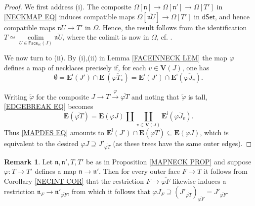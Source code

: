 \documentclass[a4paper,10pt]{article}%
\numberwithin{equation}{section}
\numberwithin{figure}{section}
\theoremstyle{definition} %
\newtheorem{remark}[equation]{Remark}%
\DeclareMathOperator{\colim}{colim}%
\newcommand{\1}{\ensuremath{\mathbbm 1}}%
\begin{document}
\begin{proof}
	We first address (i).
	The composite
	$\Omega[\mathfrak{n}] \to 
	\Omega[\mathfrak{n}'] \to 
	\Omega[T']$
	in \eqref{NECKMAP EQ}
	induces compatible maps
	$\Omega[\overline{\mathfrak{n} U}] \to \Omega[T']$
	in $\mathsf{dSet}$,
	and hence 
	compatible maps
	$\overline{\mathfrak{n} U} \to T'$ 
	in $\Omega$.
	Hence, the result follows from the identification
	$T
	\simeq  
	\underset{U \in \mathsf{Face}_{sc}(J)}{\colim}
	\overline{\mathfrak{n} U}$, where the colimit is now in $\Omega$,
	cf. \cite[Cor. 3.70]{BP_geo}.
	
	We now turn to (ii).
	By (i),(ii) in Lemma \ref{FACEINNECK LEM}
	the map $\varphi$ defines a map of necklaces 
	precisely if, 
	for each $v \in \boldsymbol{V}(J)$, one has
	\begin{equation}\label{MAPDES EQ}
	\emptyset
	=
	\boldsymbol{E}^{\mathsf{i}}(J')
	\cap
	\boldsymbol{E}^{\mathsf{i}}(\overline{ \varphi T_v})
	=
	\boldsymbol{E}^{\mathsf{i}}(J')
	\cap
	\boldsymbol{E}^{\mathsf{i}}(\overline{ \varphi J_v}).
	\end{equation}
	
	Writing $\tilde{\varphi}$ for the composite
	$
	J \to T \xrightarrow{\varphi} \overline{\varphi T}
	$
	and noting that $\tilde{\varphi}$ is tall,
	\eqref{EDGEBREAK EQ} becomes 
	\begin{equation}\label{DECOMPPR EQ}
	\boldsymbol{E}(\overline{\varphi T})
	=
	\boldsymbol{E}(\varphi J)
	\amalg
	\coprod_{v \in \boldsymbol{V}(J)}
	\boldsymbol{E}^{\mathsf{i}}(\overline{\varphi J_v}).
	\end{equation}
	Thus \eqref{MAPDES EQ}
	amounts to
	$\boldsymbol{E}^{\mathsf{i}}(J') \cap 
	\boldsymbol{E}(\overline{\varphi T})
	\subseteq
	\boldsymbol{E}(\varphi J)$,
	which is equivalent to the desired
	$\varphi J \supseteq J'_{\overline{\varphi T}}$
	(as these trees have the same outer edges).
\end{proof}



\begin{remark}\label{NECKMAPCHAR REM}
	Let $\mathfrak{n},\mathfrak{n}',T,T'$ be as in
	Proposition \ref{MAPNECK PROP}
	and suppose 
	$\varphi \colon T \to T'$
	defines a map
	$\mathfrak{n} \to \mathfrak{n}'$.
	Then for every outer face $F \to T$
	it follows from 
	Corollary \ref{NECINT COR}
	that the restriction 
	$F \to \overline{\varphi F}$
	likewise induces a restriction
	$\mathfrak{n}_F \to \mathfrak{n}'_{\overline{\varphi F}}$,
	from which it follows that
	$\varphi J_F \supseteq 
	\left(J'_{\overline{\varphi T}}\right)_{\overline{\varphi F}}
	=
	J'_{\overline{\varphi F}}$.
\end{remark}
\end{document}
